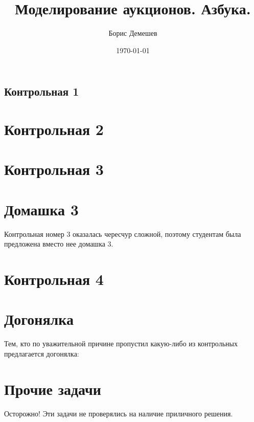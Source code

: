 \documentclass[pdftex,10pt,showtrims]{memoir}
\title{Моделирование аукционов. Азбука. }
\author{Борис Демешев}
\date{\today}
\numberwithin{equation}{page} %
\theoremstyle{definition} %
\theoremstyle{definition}
\theoremstyle{definition}
\begin{document}
\maketitle
\tableofcontents{}




\subsection{Контрольная 1}





\section{Контрольная 2}





\section{Контрольная 3}



\section{Домашка 3}

Контрольная номер 3 оказалась чересчур сложной, поэтому студентам была предложена вместо нее домашка 3.






\section{Контрольная 4}




\section{Догонялка}

Тем, кто по уважительной причине пропустил какую-либо из контрольных предлагается догонялка:



\section{Прочие задачи}

Осторожно! Эти задачи не проверялись на наличие приличного решения.




\printindex %



\end{document}
